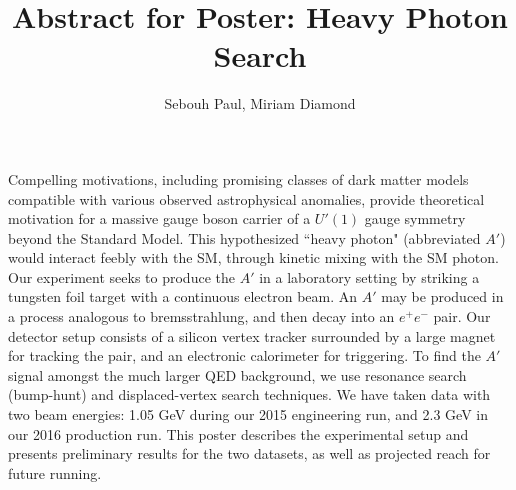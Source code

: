\documentclass[11pt]{amsart}
\title{Abstract for Poster:  Heavy Photon Search}
\author{Sebouh Paul, Miriam Diamond}
\begin{document}
\maketitle
Compelling motivations, including promising classes of dark matter models compatible with various observed astrophysical anomalies, provide theoretical motivation for a massive gauge boson carrier of a $U'(1)$ gauge symmetry beyond the Standard Model. This hypothesized ``heavy photon" (abbreviated $A'$) would interact feebly with the SM, through kinetic mixing with the SM photon.  Our experiment seeks to produce the $A'$ in a laboratory setting by striking a tungsten foil target with a continuous electron beam.  An $A'$ may be produced in a process analogous to bremsstrahlung, and then decay into an $e^+e^-$ pair.   Our detector setup consists of a silicon vertex tracker surrounded by a large magnet for tracking the pair, and an electronic calorimeter for triggering.  To find the $A'$ signal amongst the much larger QED background, we use resonance search (bump-hunt) and displaced-vertex search techniques.  We have taken data with two beam energies: 1.05 GeV during our 2015 engineering run, and 2.3 GeV in our 2016 production run. This poster describes the experimental setup and presents preliminary results for the two datasets, as well as projected reach for future running.  
\end{document}
